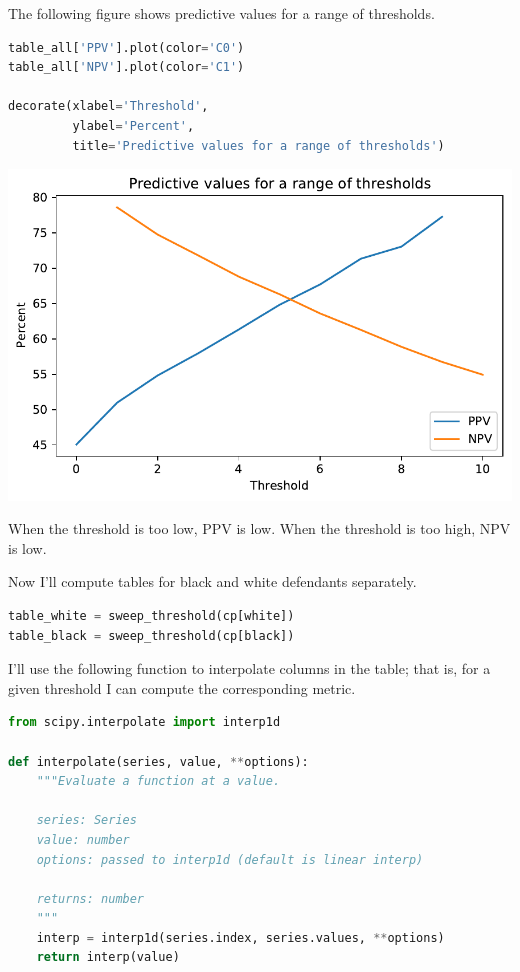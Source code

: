 The following figure shows predictive values for a range of thresholds.

\begin{lstlisting}[language=Python]
table_all['PPV'].plot(color='C0')
table_all['NPV'].plot(color='C1')

decorate(xlabel='Threshold', 
         ylabel='Percent',
         title='Predictive values for a range of thresholds')
\end{lstlisting}

\begin{center}
\includegraphics[scale=0.75]{chapters/02_calibration_files/02_calibration_39_0.pdf}
\end{center}

When the threshold is too low, PPV is low. When the threshold is too
high, NPV is low.

Now I'll compute tables for black and white defendants separately.

\begin{lstlisting}[language=Python]
table_white = sweep_threshold(cp[white])
table_black = sweep_threshold(cp[black])
\end{lstlisting}

I'll use the following function to interpolate columns in the table;
that is, for a given threshold I can compute the corresponding metric.

\begin{lstlisting}[language=Python]
from scipy.interpolate import interp1d

def interpolate(series, value, **options):
    """Evaluate a function at a value.
    
    series: Series
    value: number
    options: passed to interp1d (default is linear interp)
    
    returns: number
    """
    interp = interp1d(series.index, series.values, **options)
    return interp(value)
\end{lstlisting}

